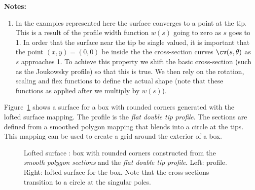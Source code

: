 {\bf Notes:} 
\begin{enumerate}
  \item In the examples represented here the surface converges to a point at the tip. This is a result
        of the profile width function $w(s)$ going to zero as $s$ goes to 1. In order that the 
       surface near the tip be single valued, it is important that the point $(x,y)=(0,0)$ be inside the
       the cross-section curves $\cv(s,\theta)$ as $s$ approaches 1. To achieve this property we 
       shift the basic cross-section (such as the Joukowsky profile) so that this is true. We then 
       rely on the rotation, scaling  and flex functions to define the actual shape (note that these
      functions as applied after we multiply by $w(s)$).
\end{enumerate}


Figure~\ref{fig:BoxLoftedSurface} shows a surface for a box with rounded corners generated
with the lofted surface mapping. The profile is the {\em flat double tip profile}. The sections
are defined from a smoothed polygon mapping that blends into a circle at the tips. 
This mapping can be used to create a grid around the exterior of a box. 
{
\newcommand{\figWidth}{8cm}
\newcommand{\trimfig}[2]{\trimPlot{#1}{#2}{.0}{.0}{.25}{.25}}
\newcommand{\figWidtha}{8cm}
\newcommand{\trimfiga}[2]{\trimPlot{#1}{#2}{.0}{.0}{.0}{.0}}
\begin{figure}[hbt]
\begin{center}
\end{center}
\caption{Lofted surface : box with rounded corners constructed from the {\em smooth polygon sections} and the {\em flat double tip profile}. Left: profile. Right: lofted surface for the box. Note that the cross-sections transition to a circle at the singular poles.}
\label{fig:BoxLoftedSurface}
\end{figure}
}


